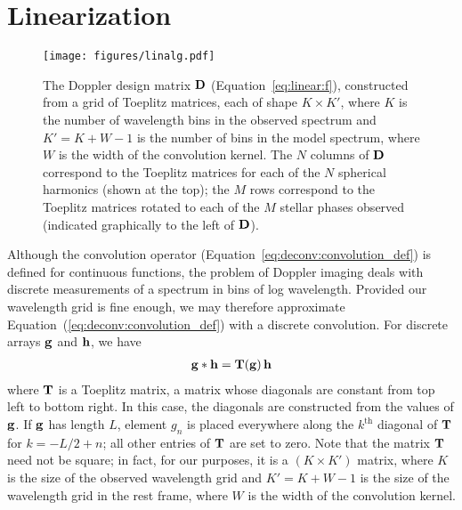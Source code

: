 \documentclass[modern]{aastex631}
\begin{document}
\section{Linearization}
\label{sec:linear}

\begin{figure}[ht!]
    \begin{centering}
        \texttt{[image: figures/linalg.pdf]}
        \caption{%
            The Doppler design matrix ${\mathbf{D}}$ (Equation~\ref{eq:linear:f}), constructed from a grid of Toeplitz matrices, each of shape $K \times K'$, where $K$ is the number of wavelength bins in the observed spectrum and $K' = K + W - 1$ is the number of bins in the model spectrum, where $W$ is the width of the convolution kernel.
            The $N$ columns of ${\mathbf{D}}$ correspond to the Toeplitz matrices for each of the $N$ spherical harmonics (shown at the top);
            the $M$ rows correspond to the Toeplitz matrices rotated to each of the $M$ stellar phases observed (indicated graphically to the left of ${\mathbf{D}}$).
        }
        \label{fig:linalg}
    \end{centering}
\end{figure}

Although the convolution operator (Equation~\ref{eq:deconv:convolution_def})
is defined for continuous functions, the problem of Doppler imaging deals with discrete measurements of a spectrum in bins of log wavelength. 
Provided our wavelength grid is fine enough, we may therefore approximate Equation~(\ref{eq:deconv:convolution_def}) with a discrete convolution.
For discrete arrays ${\mathbf{g}}$ and ${\mathbf{h}}$, we have
%
\begin{align}
    \label{eq:linear:convolution_def}
    {\ensuremath{\mathbf{g}}} * {\mathbf{h}} = {\mathbf{T(g)}} \, {\mathbf{h}}
\end{align}
%
where ${\mathbf{T}}$ is a Toeplitz matrix, a matrix whose diagonals are constant from top left to bottom right. 
In this case, the diagonals are constructed from the values of ${\mathbf{g}}$. 
If ${\mathbf{g}}$ has length $L$, element $g_n$ is placed everywhere along the $k^\mathrm{th}$ diagonal of ${\mathbf{T}}$ for $k = -L / 2 + n$; all other entries of ${\mathbf{T}}$ are set to zero. 
Note that the matrix ${\mathbf{T}}$ need not be square; in fact, for our purposes, it is a $(K \times K')$ matrix, where $K$ is the size of the observed wavelength grid and $K' = K + W - 1$ is the size of the wavelength grid in the rest frame, where $W$ is the width of the convolution kernel.
\end{document}

